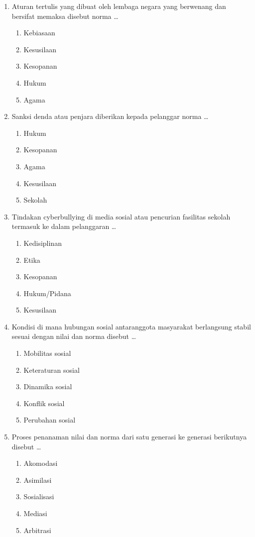 \documentclass[12pt,a4paper]{article}
\begin{document}
\begin{enumerate}[leftmargin=*]
\item Aturan tertulis yang dibuat oleh lembaga negara yang berwenang dan bersifat memaksa disebut norma \dots
    \begin{enumerate}[label=\alph*.]
        \item Kebiasaan
        \item Kesusilaan
        \item Kesopanan
        \item Hukum
        \item Agama
    \end{enumerate}

\item Sanksi denda atau penjara diberikan kepada pelanggar norma \dots
    \begin{enumerate}[label=\alph*.]
        \item Hukum
        \item Kesopanan
        \item Agama
        \item Kesusilaan
        \item Sekolah
    \end{enumerate}

\item Tindakan cyberbullying di media sosial atau pencurian fasilitas sekolah termasuk ke dalam pelanggaran \dots
    \begin{enumerate}[label=\alph*.]
        \item Kedisiplinan
        \item Etika
        \item Kesopanan
        \item Hukum/Pidana
        \item Kesusilaan
    \end{enumerate}

\item Kondisi di mana hubungan sosial antaranggota masyarakat berlangsung stabil sesuai dengan nilai dan norma disebut \dots
    \begin{enumerate}[label=\alph*.]
        \item Mobilitas sosial
        \item Keteraturan sosial
        \item Dinamika sosial
        \item Konflik sosial
        \item Perubahan sosial
    \end{enumerate}

\item Proses penanaman nilai dan norma dari satu generasi ke generasi berikutnya disebut \dots
    \begin{enumerate}[label=\alph*.]
        \item Akomodasi
        \item Asimilasi
        \item Sosialisasi
        \item Mediasi
        \item Arbitrasi
    \end{enumerate}


\end{enumerate}
\end{document}
